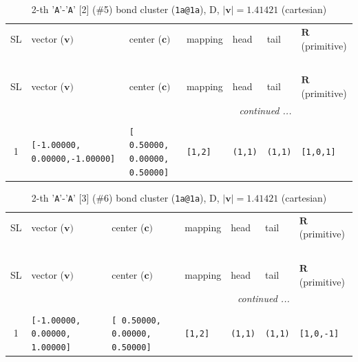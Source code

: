 \documentclass[fleqn,10pt,landscape]{jsarticle}
\begin{document}
\renewcommand{\arraystretch}{1.6}
\begin{longtable}[l]{cllllll}
\captionsetup{justification=raggedright, singlelinecheck=off}
\caption{2-th '\texttt{A}'-'\texttt{A}' [2] (\#5) bond cluster (\texttt{1a@1a}), D, $|\bm{v}|=1.41421$ (cartesian)}
 \\
 \hline \hline
SL & vector ($\bm{v})$ & center ($\bm{c})$ & mapping & head & tail & $\bm{R}$ (primitive) \\ \hline \endfirsthead

\multicolumn{6}{l}{\tablename\ \thetable{}} \\
 \hline \hline
SL & vector ($\bm{v})$ & center ($\bm{c})$ & mapping & head & tail & $\bm{R}$ (primitive) \\ \hline \endhead

 \hline \hline
\multicolumn{6}{r}{\footnotesize\it continued ...} \\ \endfoot

 \hline \hline
\multicolumn{6}{r}{} \\ \endlastfoot

1 & \texttt{[-1.00000, 0.00000,-1.00000]} & \texttt{[ 0.50000, 0.00000, 0.50000]} & \texttt{[1,2]} & \texttt{(1,1)} & \texttt{(1,1)} & \texttt{[1,0,1]} \\
\end{longtable}
\renewcommand{\arraystretch}{1.6}
\begin{longtable}[l]{cllllll}
\captionsetup{justification=raggedright, singlelinecheck=off}
\caption{2-th '\texttt{A}'-'\texttt{A}' [3] (\#6) bond cluster (\texttt{1a@1a}), D, $|\bm{v}|=1.41421$ (cartesian)}
 \\
 \hline \hline
SL & vector ($\bm{v})$ & center ($\bm{c})$ & mapping & head & tail & $\bm{R}$ (primitive) \\ \hline \endfirsthead

\multicolumn{6}{l}{\tablename\ \thetable{}} \\
 \hline \hline
SL & vector ($\bm{v})$ & center ($\bm{c})$ & mapping & head & tail & $\bm{R}$ (primitive) \\ \hline \endhead

 \hline \hline
\multicolumn{6}{r}{\footnotesize\it continued ...} \\ \endfoot

 \hline \hline
\multicolumn{6}{r}{} \\ \endlastfoot

1 & \texttt{[-1.00000, 0.00000, 1.00000]} & \texttt{[ 0.50000, 0.00000, 0.50000]} & \texttt{[1,2]} & \texttt{(1,1)} & \texttt{(1,1)} & \texttt{[1,0,-1]} \\
\end{longtable}
\end{document}

